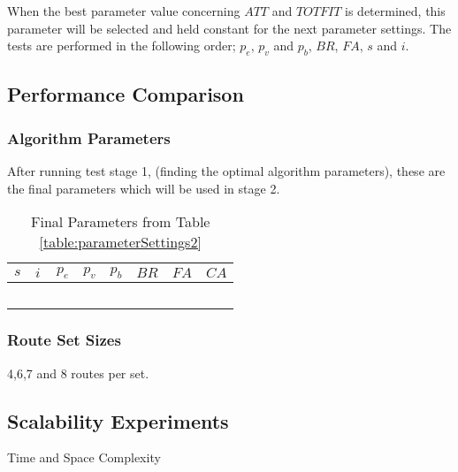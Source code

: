 When the best parameter value concerning $ATT$ and $TOTFIT$ is determined, this parameter will be selected and held constant for the next parameter settings. The tests are performed in the following order; $p_{e}$, $p_{v}$ and $p_{b}$, $BR$, $FA$, $s$ and $i$.

\subsection{Performance Comparison}

\subsubsection{Algorithm Parameters}
After running test stage 1, (finding the optimal algorithm parameters), these are the final parameters which will be used in stage 2.

\begin{table}[H]
	\centering
    \begin{tabular}{|l|l|l|l|l|l|l|l|}
 	\hline
 	$s$ & $i$ & $p_{e}$ & $p_{v}$ & $p_{b}$ & $BR$ & $FA$ & $CA$  \\
 	\hline
    ~ & ~ & ~ & ~ & ~ & ~ & ~ & ~  \\
	\hline
    \end{tabular}
    \caption {Final Parameters from Table \ref{table:parameterSettings2}}
    \label{table:finalParameters}
	\end{table}

\subsubsection{Route Set Sizes}
4,6,7 and 8 routes per set.

\subsection{Scalability Experiments}
Time and Space Complexity
